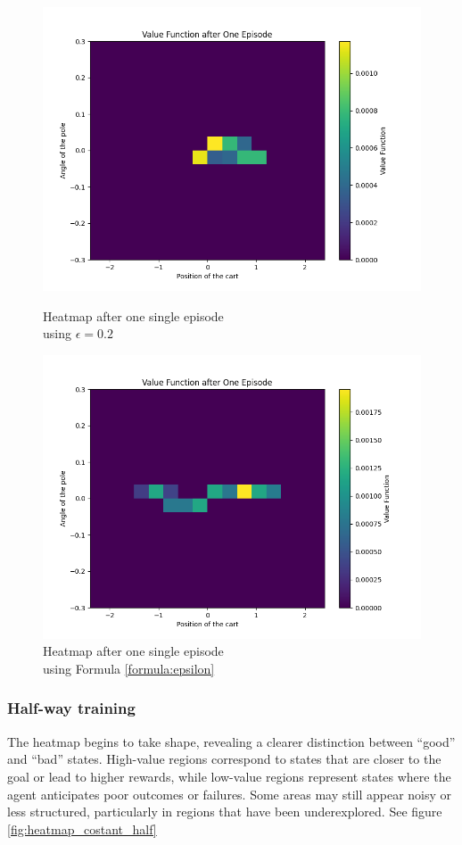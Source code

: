 \documentclass{article}
\begin{document}
\begin{figure}[!htb]
	\begin{minipage}{0.48\textwidth}
	\centering
	\includegraphics[width=0.5\linewidth]{../data/plot/heatmap_after_one_episode_constant_0.2.png}
	\caption{Heatmap after one single episode \\ using $\epsilon = 0.2$}
	\label{fig:heatmap_costant_init}
	\end{minipage}\hfill
	\begin{minipage}{0.48\textwidth}
	\centering
	\includegraphics[width=0.5\linewidth]{../data/plot/heatmap_after_one_episode_glie.png}
	\caption{Heatmap after one single episode \\ using Formula \ref{formula:epsilon}}
	\label{fig:heatmap_costant_init}
	\end{minipage}
\end{figure}

\subsubsection{Half-way training}
The heatmap begins to take shape, revealing a clearer distinction between “good” and “bad” states. High-value regions correspond to states that are closer to the goal or lead to higher rewards, while low-value regions represent states where the agent anticipates poor outcomes or failures. Some areas may still appear noisy or less structured, particularly in regions that have been underexplored. See figure \ref{fig:heatmap_costant_half}
\end{document}
